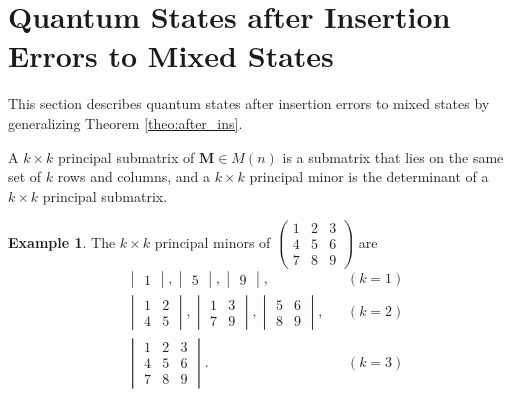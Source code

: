 \documentclass[reprint,amsmath,amssymb,aps,]{revtex4-2}
\theoremstyle{definition}
\newtheorem{exam}{Example}
\newcommand{\1}{\mbox{1}\hspace{-0.25em}\mbox{l}}%
\newcommand{\mat}[1]{\mathbf{#1}}
\begin{document}
\section{Quantum States after Insertion Errors to Mixed States}
\label{sec:ins_state}
This section describes
quantum states after insertion errors to mixed states
by generalizing Theorem \ref{theo:after_ins}.

A $k \times k$ principal submatrix of $\mat{M} \in M(n)$
is
a submatrix that lies on the same set of $k$ rows and columns,
and
a $k \times k$ principal minor is the determinant of a $k \times k$
principal submatrix.
\begin{exam}
  The $k \times k$ principal minors of
  $\begin{pmatrix} 1 & 2 & 3\\ 4 & 5 & 6\\ 7 & 8 & 9\end{pmatrix}$ are
    \begin{align*}
      &\begin{vmatrix}
        1 
      \end{vmatrix},
      \begin{vmatrix}
        5
      \end{vmatrix},
      \begin{vmatrix}
        9
      \end{vmatrix},
      &&(k=1)\\
      &\begin{vmatrix}
        1 & 2\\
        4 & 5
      \end{vmatrix},
      \begin{vmatrix}
        1 & 3\\
        7 & 9
      \end{vmatrix},
      \begin{vmatrix}
        5 & 6\\
        8 & 9
      \end{vmatrix},
      &&(k=2)\\
      &\begin{vmatrix}
        1 & 2 & 3\\
        4 & 5 & 6\\
        7 & 8 & 9
      \end{vmatrix}.
      &&(k=3)
    \end{align*}
\end{exam}
\end{document}

